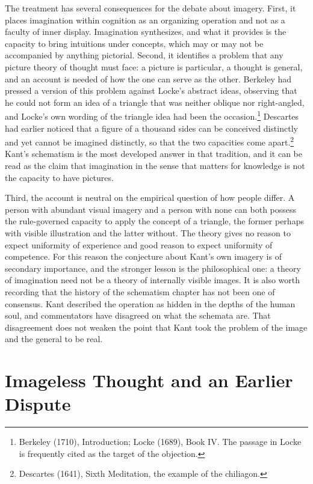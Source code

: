 \documentclass[11pt]{article}
\theoremstyle{remark}
\begin{document}
The treatment has several consequences for the debate about imagery. First, it places imagination within cognition as an organizing operation and not as a faculty of inner display. Imagination synthesizes, and what it provides is the capacity to bring intuitions under concepts, which may or may not be accompanied by anything pictorial. Second, it identifies a problem that any picture theory of thought must face: a picture is particular, a thought is general, and an account is needed of how the one can serve as the other. Berkeley had pressed a version of this problem against Locke's abstract ideas, observing that he could not form an idea of a triangle that was neither oblique nor right-angled, and Locke's own wording of the triangle idea had been the occasion.\footnote{Berkeley (1710), Introduction; Locke (1689), Book IV. The passage in Locke is frequently cited as the target of the objection.} Descartes had earlier noticed that a figure of a thousand sides can be conceived distinctly and yet cannot be imagined distinctly, so that the two capacities come apart.\footnote{Descartes (1641), Sixth Meditation, the example of the chiliagon.} Kant's schematism is the most developed answer in that tradition, and it can be read as the claim that imagination in the sense that matters for knowledge is not the capacity to have pictures.

Third, the account is neutral on the empirical question of how people differ. A person with abundant visual imagery and a person with none can both possess the rule-governed capacity to apply the concept of a triangle, the former perhaps with visible illustration and the latter without. The theory gives no reason to expect uniformity of experience and good reason to expect uniformity of competence. For this reason the conjecture about Kant's own imagery is of secondary importance, and the stronger lesson is the philosophical one: a theory of imagination need not be a theory of internally visible images. It is also worth recording that the history of the schematism chapter has not been one of consensus. Kant described the operation as hidden in the depths of the human soul, and commentators have disagreed on what the schemata are. That disagreement does not weaken the point that Kant took the problem of the image and the general to be real.

\section{Imageless Thought and an Earlier Dispute}
\end{document}
